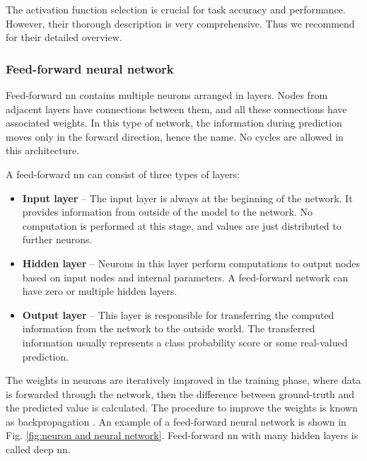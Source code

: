             The activation function selection is crucial for task accuracy and performance. However, their thorough description is very comprehensive. Thus we recommend \cite{cs231n} for their detailed overview.

        \subsubsection{Feed-forward neural network}
            Feed-forward \gls{nn} \cite{shalev2014understanding, goodfellow2016deep} contains multiple neurons arranged in layers. Nodes from adjacent layers have connections between them, and all these connections have associated weights. In this type of network, the information during prediction moves only in the forward direction, hence the name. No cycles are allowed in this architecture.
            
            A feed-forward \gls{nn} can consist of three types of layers:
            
            \begin{itemize}
                \item \textbf{Input layer} -- The input layer is always at the beginning of the network. It provides information from outside of the model to the network. No computation is performed at this stage, and values are just distributed to further neurons.
                \item \textbf{Hidden layer} -- Neurons in this layer perform computations to output nodes based on input nodes and internal parameters. A feed-forward network can have zero or multiple hidden layers.
                \item \textbf{Output layer} -- This layer is responsible for transferring the computed information from the network to the outside world. The transferred information usually represents a class probability score or some real-valued prediction.
            \end{itemize}
           
            The weights in neurons are iteratively improved in the training phase, where data is forwarded through the network, then the difference between ground-truth and the predicted value is calculated. The procedure to improve the weights is known as backpropagation \cite{hecht1992theory}.  An example of a feed-forward neural network is shown in Fig. \ref{fig:neuron and neural network}. Feed-forward \gls{nn} with many hidden layers is called deep \gls{nn}.


